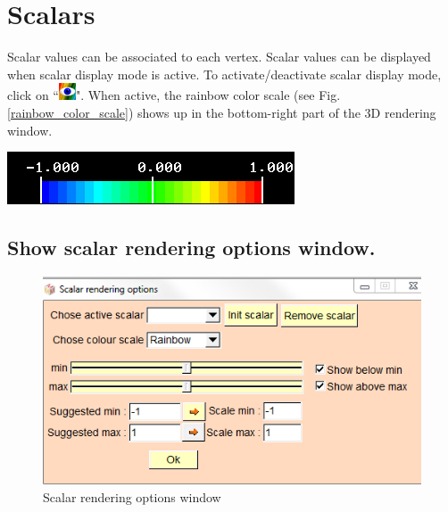 
\chapter{Scalars}\label{scalars_chapter}
\minitoc 

\noindent
\begin{minipage}{0.5\textwidth}
Scalar values can be associated to each vertex. Scalar values can be displayed when scalar display mode is active. To activate/deactivate scalar display mode, click on ``\includegraphics[scale=0.7]{images/pixmap/show_color_scale.png}".
When active, the rainbow color scale (see Fig. \ref{rainbow_color_scale}) shows up in the
bottom-right part of the 3D rendering window.
\end{minipage}    
\begin{minipage}{0.5\textwidth}\centering
  \includegraphics[scale=0.5]{images/Scalars_renreding/color_scale.png}
\label{rainbow_color_scale}
 \end{minipage} 
\noindent


\section{Show scalar rendering options window.}


\begin{figure}
  \centering
  \includegraphics[scale=0.5]{images/Scalars_renreding/color_scale_rendering_window.png}
\caption{Scalar rendering options window}	
\label{Scalar_rendering_options_window}
 \end{figure}


